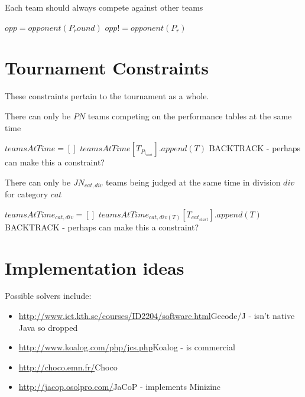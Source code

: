 \documentclass[letterpaper,11pt]{report}
\begin{document}
\begin{algorithm}
\caption{Each team should always compete against other teams}
\begin{algorithmic}
  \STATE $opp = opponent(P_round)$
    \STATE $opp != opponent(P_r)$
  \ENDFOR
\ENDFOR
\end{algorithmic}
\end{algorithm}


\section{Tournament Constraints}
These constraints pertain to the tournament as a whole.

\begin{algorithm}
\caption{There can only be $PN$ teams competing on the performance tables
at the same time}
\begin{algorithmic}

\STATE $teamsAtTime = []$
    \STATE $teamsAtTime[T_{P_{i_{start}}}].append(T)$
  \ENDFOR
      \STATE BACKTRACK - perhaps can make this a constraint?
    \ENDIF
  \ENDFOR
\ENDFOR

\end{algorithmic}
\end{algorithm}

\begin{algorithm}
\caption{There can only be $JN_{cat,div}$ teams being judged at the same
time in division $div$ for category $cat$}
\begin{algorithmic}
    \STATE $teamsAtTime_{cat,div} = []$
  \ENDFOR
    \STATE $teamsAtTime_{cat,div(T)}[T_{cat_{start}}].append(T)$
  \ENDFOR
        \STATE BACKTRACK - perhaps can make this a constraint?
      \ENDIF
    \ENDFOR
  \ENDFOR
\ENDFOR
\end{algorithmic}
\end{algorithm}

\section{Implementation ideas}
Possible solvers include:
\begin{itemize}
\item \url{http://www.ict.kth.se/courses/ID2204/software.html}{Gecode/J} - isn't native Java so dropped
\item \url{http://www.koalog.com/php/jcs.php}{Koalog} - is commercial
\item \url{http://choco.emn.fr/}{Choco}
\item \url{http://jacop.osolpro.com/}{JaCoP} - implements Minizinc
\end{itemize}
\end{document}
